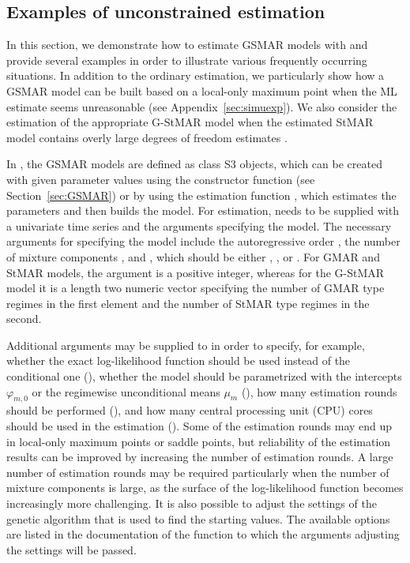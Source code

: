 \documentclass[nojss]{jss} %
\begin{document}
\subsection{Examples of unconstrained estimation}\label{sec:example_estim}
In this section, we demonstrate how to estimate GSMAR models with  and provide several examples in order to illustrate various frequently occurring situations. In addition to the ordinary estimation, we particularly show how a GSMAR model can be built based on a local-only maximum point when the ML estimate seems unreasonable (see Appendix~\ref{sec:simuexp}). We also consider the estimation of the appropriate G-StMAR model when the estimated StMAR model contains overly large degrees of freedom estimates \citep[see][Section 4]{Virolainen:2020}.

In , the GSMAR models are defined as class  S3 objects, which can be created with given parameter values using the constructor function  (see Section~\ref{sec:GSMAR}) or by using the estimation function , which estimates the parameters and then builds the model. For estimation,  needs to be supplied with a univariate time series and the arguments specifying the model. The necessary arguments for specifying the model include the autoregressive order , the number of mixture components , and , which should be either , , or . For GMAR and StMAR models, the argument  is a positive integer, whereas for the G-StMAR model it is a length two numeric vector specifying the number of GMAR type regimes in the first element and the number of StMAR type regimes in the second.

Additional arguments may be supplied to  in order to specify, for example, whether the exact log-likelihood function should be used instead of the conditional one (), whether the model should be parametrized with the intercepts $\varphi_{m,0}$ or the regimewise unconditional means $\mu_m$ (), how many estimation rounds should be performed (), and how many central processing unit (CPU) cores should be used in the estimation (). Some of the estimation rounds may end up in local-only maximum points or saddle points, but reliability of the estimation results can be improved by increasing the number of estimation rounds. A large number of estimation rounds may be required particularly when the number of mixture components is large, as the surface of the log-likelihood function becomes increasingly more challenging. It is also possible to adjust the settings of the genetic algorithm that is used to find the starting values. The available options are listed in the documentation of the function  to which the arguments adjusting the settings will be passed.
\end{document}
